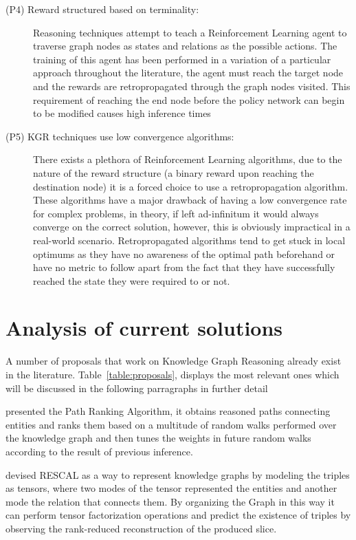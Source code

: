 \begin{description}
    \item[(P4) Reward structured based on terminality:] Reasoning techniques attempt to teach a Reinforcement Learning agent to traverse graph nodes as states and relations as the possible actions. The training of this agent has been performed in a variation of a particular approach throughout the literature, the agent must reach the target node and the rewards are retropropagated through the graph nodes visited. This requirement of reaching the end node before the policy network can begin to be modified causes high inference times \\
    
    \item[(P5) KGR techniques use low convergence algorithms:] There exists a plethora of Reinforcement Learning algorithms, due to the nature of the reward structure (a binary reward upon reaching the destination node) it is a forced choice to use a retropropagation algorithm. These algorithms have a major drawback of having a low convergence rate for complex problems, in theory, if left ad-infinitum it would always converge on the correct solution, however, this is obviously impractical in a real-world scenario. Retropropagated algorithms tend to get stuck in local optimums as they have no awareness of the optimal path beforehand or have no metric to follow apart from the fact that they have successfully reached the state they were required to or not.
\end{description}

\section{Analysis of current solutions}\label{sec:moti-analysis}

A number of proposals that work on Knowledge Graph Reasoning already exist in the literature. Table~\ref{table:proposals}, displays the most relevant ones which will be discussed in the following parragraphs in further detail



\citet{lao2011random} presented the Path Ranking Algorithm, it obtains reasoned paths connecting entities and ranks them based on a multitude of random walks performed over the knowledge graph and then tunes the weights in future random walks according to the result of previous inference.

\citet{nickel2011three} devised RESCAL as a way to represent knowledge graphs by modeling the triples as tensors, where two modes of the tensor represented the entities and another mode the relation that connects them. By organizing the Graph in this way it can perform tensor factorization operations and predict the existence of triples by observing the rank-reduced reconstruction of the produced slice.

